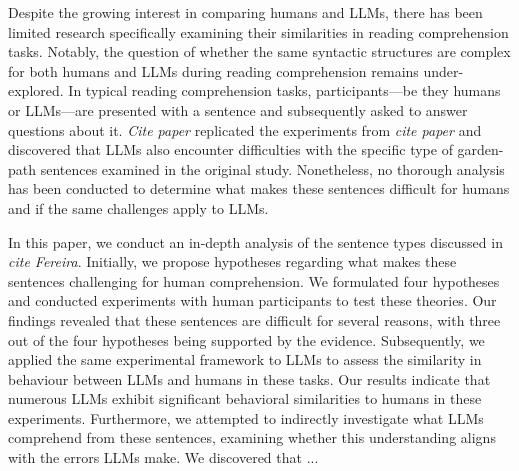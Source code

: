 Despite the growing interest in comparing humans and LLMs, there has been limited research specifically examining their similarities in reading comprehension tasks. Notably, the question of whether the same syntactic structures are complex for both humans and LLMs during reading comprehension remains under-explored. In typical reading comprehension tasks, participants—be they humans or LLMs—are presented with a sentence and subsequently asked to answer questions about it. \emph{Cite paper} replicated the experiments from \emph{cite paper} and discovered that LLMs also encounter difficulties with the specific type of garden-path sentences examined in the original study. Nonetheless, no thorough analysis has been conducted to determine what makes these sentences difficult for humans and if the same challenges apply to LLMs.

In this paper, we conduct an in-depth analysis of the sentence types discussed in \emph{cite Fereira}. Initially, we propose hypotheses regarding what makes these sentences challenging for human comprehension. We formulated four hypotheses and conducted experiments with human participants to test these theories. Our findings revealed that these sentences are difficult for several reasons, with three out of the four hypotheses being supported by the evidence. Subsequently, we applied the same experimental framework to LLMs to assess the similarity in behaviour between LLMs and humans in these tasks. Our results indicate that numerous LLMs exhibit significant behavioral similarities to humans in these experiments. Furthermore, we attempted to indirectly investigate what LLMs comprehend from these sentences, examining whether this understanding aligns with the errors LLMs make. We discovered that ...
